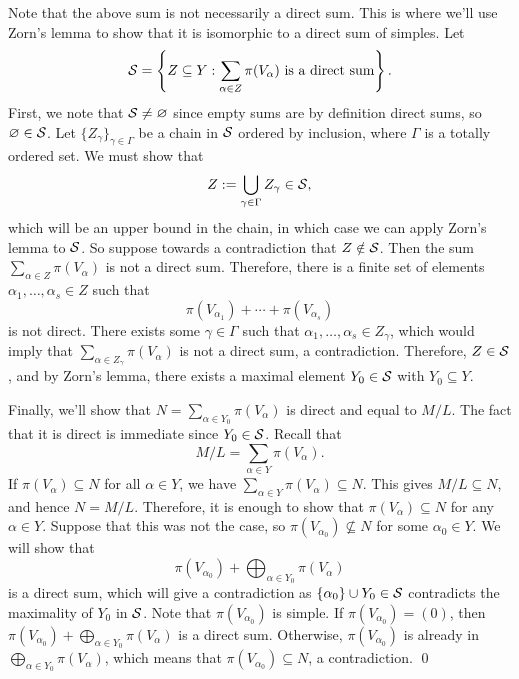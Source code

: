 \begin{enumerate}[(1)]
    Note that the above sum is not necessarily a direct sum. This is where 
    we'll use Zorn's lemma to show that it is isomorphic to a direct sum of 
    simples. Let 
    \[ {\cal S} = \left\{Z \subseteq Y : \sum_{\alpha \in Z} \pi(V_\alpha) 
    \text{ is a direct sum} \right\}. \] 
    First, we note that ${\cal S} \neq \varnothing$ since empty sums are 
    by definition direct sums, so $\varnothing \in {\cal S}$. Let 
    $\{Z_\gamma\}_{\gamma \in \Gamma}$ be a chain in ${\cal S}$ ordered by 
    inclusion, where $\Gamma$ is a totally ordered set. We must show that 
    \[ Z := \bigcup_{\gamma \in \Gamma} Z_\gamma \in {\cal S}, \] 
    which will be an upper bound in the chain, in which case we can apply 
    Zorn's lemma to ${\cal S}$. So suppose towards a contradiction that 
    $Z \notin {\cal S}$. Then the sum $\sum_{\alpha \in Z} \pi(V_\alpha)$ 
    is not a direct sum. Therefore, there is a finite set of elements 
    $\alpha_1, \dots, \alpha_s \in Z$ such that 
    \[ \pi(V_{\alpha_1}) + \cdots + \pi(V_{\alpha_s}) \] 
    is not direct. There exists some $\gamma \in \Gamma$ such that 
    $\alpha_1, \dots, \alpha_s \in Z_\gamma$, which would imply that 
    $\sum_{\alpha \in Z_\gamma} \pi(V_\alpha)$ is not a direct sum, a contradiction. 
    Therefore, $Z \in {\cal S}$, and by Zorn's lemma, there exists a maximal 
    element $Y_0 \in {\cal S}$ with $Y_0 \subseteq Y$. 

    Finally, we'll show that $N = \sum_{\alpha \in Y_0} \pi(V_\alpha)$ is 
    direct and equal to $M/L$. The fact that it is direct is immediate since 
    $Y_0 \in {\cal S}$. Recall that 
    \[ M/L = \sum_{\alpha \in Y} \pi(V_\alpha). \] 
    If $\pi(V_\alpha) \subseteq N$ for all $\alpha \in Y$, we have 
    $\sum_{\alpha \in Y} \pi(V_\alpha) \subseteq N$. This gives $M/L \subseteq N$, 
    and hence $N = M/L$. Therefore, it is enough to show that $\pi(V_\alpha) 
    \subseteq N$ for any $\alpha \in Y$. Suppose that this was not the case, 
    so $\pi(V_{\alpha_0}) \not\subseteq N$ for some $\alpha_0 \in Y$. 
    We will show that 
    \[ \pi(V_{\alpha_0}) + \bigoplus_{\alpha \in Y_0} \pi(V_\alpha) \] 
    is a direct sum, which will give a contradiction as $\{\alpha_0\} 
    \cup Y_0 \in {\cal S}$ contradicts the maximality of $Y_0$ in ${\cal S}$. 
    Note that $\pi(V_{\alpha_0})$ is simple. If $\pi(V_{\alpha_0}) = (0)$, then 
    $\pi(V_{\alpha_0}) + \bigoplus_{\alpha \in Y_0} \pi(V_\alpha)$ is a direct 
    sum. Otherwise, $\pi(V_{\alpha_0})$ is already in 
    $\bigoplus_{\alpha \in Y_0} \pi(V_\alpha)$, which means that 
    $\pi(V_{\alpha_0}) \subseteq N$, a contradiction. \qed 
\end{enumerate}

